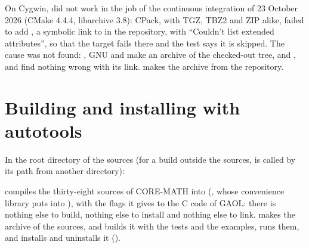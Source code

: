 \begin{Rem}
On Cygwin,  did not work in the job of the continuous
integration of 23 October 2026 (CMake 4.4.4, libarchive 3.8): CPack, with
TGZ, TBZ2 and ZIP alike, failed to add , a symbolic link to
 in the repository, with ``Couldn't list extended
attributes'', so that the target fails there and the test
 says it is skipped. The cause was not found:
, GNU  and  make an archive of
the checked-out tree, and ,  and
 find nothing wrong with its link.  makes
the archive from the repository.
\end{Rem}

\section{Building and installing with autotools}\label{sec:configuration}
%

In the root directory of the sources (for a build outside the sources,
 is called by its path from another directory):

\begin{cmdshell}
\end{cmdshell}

\noindent
{} compiles the thirty-eight sources of CORE-MATH into
 (, whose convenience library
 puts into ), with the flags it gives to the C
code of GAOL: there is nothing else to build, nothing else to install and
nothing else to link.  makes the archive of the sources, and
 builds it with the tests and the examples, runs them, and
installs and uninstalls it ().

